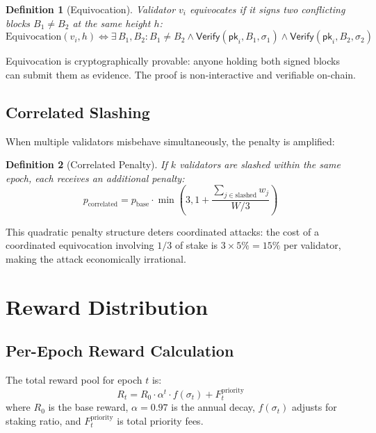 \documentclass[11pt,a4paper]{article}
\newtheorem{definition}{Definition}
\begin{document}
\begin{definition}[Equivocation]
Validator $v_i$ equivocates if it signs two conflicting blocks $B_1 \neq B_2$ at the same height $h$:
\begin{equation}
    \text{Equivocation}(v_i, h) \iff \exists\, B_1, B_2 : B_1 \neq B_2 \wedge \mathsf{Verify}(\mathsf{pk}_i, B_1, \sigma_1) \wedge \mathsf{Verify}(\mathsf{pk}_i, B_2, \sigma_2)
\end{equation}
\end{definition}

Equivocation is cryptographically provable: anyone holding both signed blocks can submit them as evidence. The proof is non-interactive and verifiable on-chain.

\subsection{Correlated Slashing}

When multiple validators misbehave simultaneously, the penalty is amplified:

\begin{definition}[Correlated Penalty]
If $k$ validators are slashed within the same epoch, each receives an additional penalty:
\begin{equation}
    p_{\text{correlated}} = p_{\text{base}} \cdot \min\left(3, 1 + \frac{\sum_{j \in \text{slashed}} w_j}{W/3}\right)
\end{equation}
\end{definition}

This quadratic penalty structure deters coordinated attacks: the cost of a coordinated equivocation involving $1/3$ of stake is $3 \times 5\% = 15\%$ per validator, making the attack economically irrational.

\section{Reward Distribution}\label{sec:rewards}

\subsection{Per-Epoch Reward Calculation}

The total reward pool for epoch $t$ is:
\begin{equation}
    R_t = R_0 \cdot \alpha^t \cdot f(\sigma_t) + F_t^{\text{priority}}
\end{equation}
where $R_0$ is the base reward, $\alpha = 0.97$ is the annual decay, $f(\sigma_t)$ adjusts for staking ratio, and $F_t^{\text{priority}}$ is total priority fees.
\end{document}
